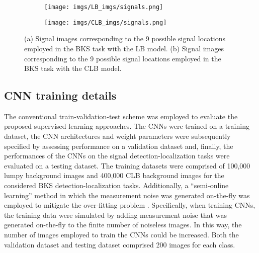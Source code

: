 \documentclass[journal]{IEEEtran}
\begin{document}
\begin{figure}[H]
\centering
\begin{subfigure}[b]{0.24\textwidth}
   \centering
 \texttt{[image: imgs/LB\_imgs/signals.png]}
   \vspace{-0.5cm}
 \caption{}
 \end{subfigure}
 \begin{subfigure}[b]{0.24\textwidth}
  \centering
 \texttt{[image: imgs/CLB\_imgs/signals.png]}
   \vspace{-0.5cm}
  \caption{}
 \end{subfigure}
  \vspace{-0.5cm}
 \caption{(a) Signal images corresponding to the 9 possible signal locations employed in the BKS task with the LB
model. (b) Signal images corresponding to the 9 possible signal locations employed in the BKS task with the CLB
model.}
 \label{fig:CLB_sigs}
\end{figure}
\vspace{-0.4cm}
\subsection{CNN training details}
The conventional train-validation-test scheme was employed to evaluate the proposed supervised learning approaches. The CNNs were trained on a training dataset, the CNN architectures and weight parameters were subsequently specified by assessing performance on a validation dataset and,  finally, the performances of the CNNs on the signal detection-localization tasks were evaluated on a testing dataset. The training datasets were comprised of 100,000 lumpy background images and 400,000  CLB background images for the considered BKS detection-localization tasks. Additionally, a ``semi-online learning” method 
in which the measurement noise was generated on-the-fly was employed to mitigate the over-fitting
 problem \cite{zhou2019approximating}. {Specifically, when training CNNs, the training data were simulated by adding measurement noise that was generated on-the-fly to the finite number of noiseless images\cite{zhou2019approximating}. In this way, the number of images employed to train the CNNs could be increased.}
Both the validation dataset and testing dataset comprised 200 images for each class.
\end{document}
